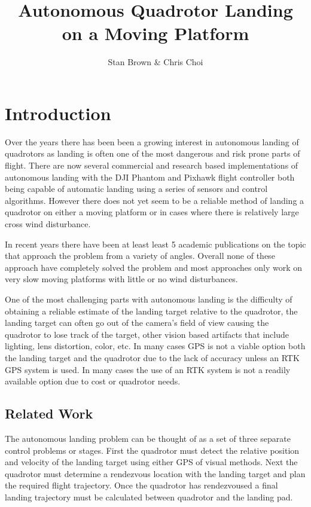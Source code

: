 \documentclass[11pt, twocolumn]{article}
\begin{document}
\title{Autonomous Quadrotor Landing on a Moving Platform}
\author{Stan Brown \& Chris Choi}
\date{}
\maketitle

\section{Introduction}
Over the years there has been been a growing interest in autonomous landing of quadrotors as landing is often one of the most dangerous and risk prone parts of flight. There are now several commercial and research based implementations of autonomous landing with the DJI Phantom and Pixhawk flight controller both being capable of automatic landing using a series of sensors and control algorithms. However there does not yet seem to be a reliable method of landing a quadrotor on either a moving platform or in cases where there is relatively large cross wind disturbance. 

In recent years there have been at least least 5 academic publications on the topic \cite{Lee2012, Kim2014, Voos2010, Friis2009, Ling2014, Herisse2012} that approach the problem from a variety of angles. Overall none of these approach have completely solved the problem and most approaches only work on very slow moving platforms with little or no wind disturbances. 

One of the most challenging parts with autonomous landing is the difficulty of obtaining a reliable estimate of the landing target relative to the quadrotor, the landing target can often go out of the camera's field of view causing the quadrotor to lose track of the target, other vision based artifacts that include lighting, lens distortion, color, etc. In many cases GPS is not a viable option both the landing target and the quadrotor due to the lack of accuracy unless an RTK GPS system is used. In many cases the use of an RTK system is not a readily available option due to cost or quadrotor needs. 

\subsection{Related Work}
The autonomous landing problem can be thought of as a set of three separate control problems or stages. First the quadrotor must detect the relative position and velocity of the landing target using either GPS of visual methods. Next the quadrotor must determine a rendezvous location with the landing target and plan the required flight trajectory. Once the quadrotor has rendezvoused a final landing trajectory must be calculated between quadrotor and the landing pad. 
\end{document}
